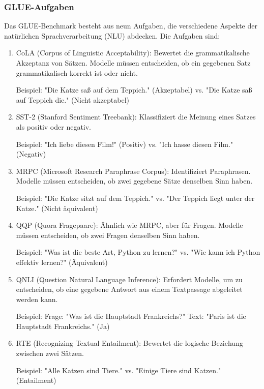 \subsubsection*{GLUE-Aufgaben}

Das GLUE-Benchmark besteht aus neun Aufgaben, die verschiedene Aspekte der natürlichen Sprachverarbeitung (NLU) abdecken. Die Aufgaben sind:

\begin{enumerate}
\item CoLA (Corpus of Linguistic Acceptability): Bewertet die grammatikalische Akzeptanz von Sätzen. Modelle müssen entscheiden, ob ein gegebenen Satz grammatikalisch korrekt ist oder nicht.

Beispiel: "Die Katze saß auf dem Teppich." (Akzeptabel) vs. "Die Katze saß auf Teppich die." (Nicht akzeptabel)

\item SST-2 (Stanford Sentiment Treebank): Klassifiziert die Meinung eines Satzes als positiv oder negativ.

Beispiel: "Ich liebe diesen Film!" (Positiv) vs. "Ich hasse diesen Film." (Negativ)

\item MRPC (Microsoft Research Paraphrase Corpus): Identifiziert Paraphrasen. Modelle müssen entscheiden, ob zwei gegebene Sätze denselben Sinn haben.

Beispiel: "Die Katze sitzt auf dem Teppich." vs. "Der Teppich liegt unter der Katze." (Nicht äquivalent)

\item QQP (Quora Fragepaare): Ähnlich wie MRPC, aber für Fragen. Modelle müssen entscheiden, ob zwei Fragen denselben Sinn haben.

Beispiel: "Was ist die beste Art, Python zu lernen?" vs. "Wie kann ich Python effektiv lernen?" (Äquivalent)

\item QNLI (Question Natural Language Inference): Erfordert Modelle, um zu entscheiden, ob eine gegebene Antwort aus einem Textpassage abgeleitet werden kann.

Beispiel: Frage: "Was ist die Hauptstadt Frankreichs?" Text: "Paris ist die Hauptstadt Frankreichs." (Ja)

\item RTE (Recognizing Textual Entailment): Bewertet die logische Beziehung zwischen zwei Sätzen.

Beispiel: "Alle Katzen sind Tiere." vs. "Einige Tiere sind Katzen." (Entailment)


\end{enumerate}
